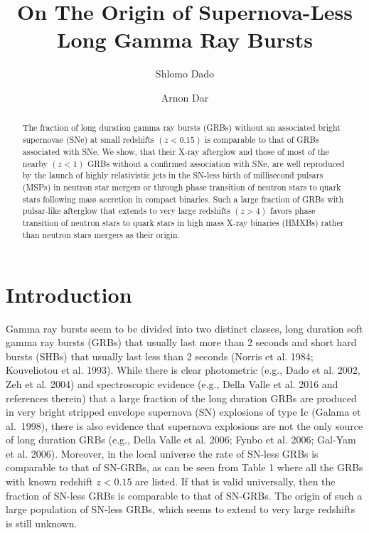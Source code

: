 \documentclass[twocolumn]{aastex61}
\begin{document}
\title{On The Origin of Supernova-Less Long Gamma Ray Bursts}

\author{Shlomo Dado}
\author{Arnon Dar}


\begin{abstract} 
The fraction of long duration gamma ray bursts (GRBs) without an 
associated bright supernovae (SNe) at small redshifts $(z<0.15)$ 
is comparable to that of GRBs associated with SNe. We show, that their 
X-ray afterglow and those of most of the nearby $(z<1)$ 
GRBs without a confirmed association with SNe, are well reproduced by 
the launch of highly relativistic jets in the SN-less birth of millisecond 
pulsars (MSPs) in neutron star mergers or through phase transition of 
neutron stars to quark stars following mass accretion in compact 
binaries. Such a large fraction of GRBs with pulsar-like afterglow that 
extends to very large redshifts $(z>4)$ favors phase transition of 
neutron stars to quark stars in high mass X-ray binaries (HMXBs) 
rather than neutron stars mergers as their origin.
\end{abstract}


\section{Introduction} 
Gamma ray bursts seem to be divided into two distinct classes, long 
duration soft gamma ray bursts (GRBs) that usually last more than 2 
seconds and short hard bursts (SHBs) that usually last less than 2 
seconds (Norris et al. 1984; Kouveliotou et al. 1993). While there is 
clear photometric (e.g., Dado et al. 2002, Zeh et al. 2004) and 
spectroscopic evidence (e.g., Della Valle et al. 2016 and references 
therein) that a large fraction of the long duration GRBs are produced 
in very bright stripped envelope supernova (SN) explosions of type Ic 
(Galama et al.~1998), there is also evidence that supernova explosions 
are not the only source of long duration GRBs (e.g., Della Valle et 
al. 2006; Fynbo et al. 2006; Gal-Yam et al. 2006). Moreover, in the 
local universe the rate of SN-less GRBs is comparable to that of 
SN-GRBs, as can be seen from Table 1 where all the GRBs with known 
redshift $z<0.15$ are listed. If that is valid universally, then the 
fraction of SN-less GRBs is comparable to that of SN-GRBs. The origin 
of such a large population of SN-less GRBs, which seems to extend to 
very large redshifts is still unknown.
\end{document}
